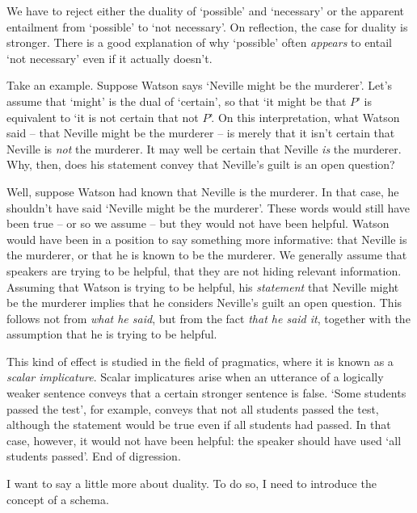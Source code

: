 
We have to reject either the duality of `possible' and `necessary' or the
apparent entailment from `possible' to `not necessary'. On reflection, the case
for duality is stronger. There is a good explanation of why `possible' often
\emph{appears} to entail `not necessary' even if it actually doesn't.


Take an example. Suppose Watson says `Neville might be the murderer'. Let's
assume that `might' is the dual of `certain', so that `it might be that $P$' is
equivalent to `it is not certain that not $P$'. On this interpretation, what
Watson said -- that Neville might be the murderer -- is merely that it isn't
certain that Neville is \emph{not} the murderer. It may well be certain that
Neville \emph{is} the murderer. Why, then, does his statement convey that
Neville's guilt is an open question?


Well, suppose Watson had known that Neville is the murderer. In that case, he
shouldn't have said `Neville might be the murderer'. These words would still
have been true -- or so we assume -- but they would not have been helpful.
Watson would have been in a position to say something more informative: that
Neville is the murderer, or that he is known to be the murderer. We generally
assume that speakers are trying to be helpful, that they are not hiding relevant
information. Assuming that Watson is trying to be helpful, his \emph{statement}
that Neville might be the murderer implies that he considers Neville's guilt an
open question. This follows not from \emph{what he said}, but from the fact
\emph{that he said it}, together with the assumption that he is trying to be
helpful.


This kind of effect is studied in the field of pragmatics, where it is known as
a \emph{scalar implicature}. Scalar implicatures arise when an utterance of a
logically weaker sentence conveys that a certain stronger sentence is false.
`Some students passed the test', for example, conveys that not all students
passed the test, although the statement would be true even if all students had
passed. In that case, however, it would not have been helpful: the speaker
should have used `all students passed'.
End of digression.


I want to say a little more about duality. To do so, I need to introduce the
concept of a schema.

